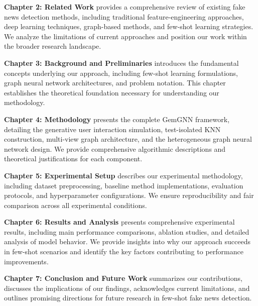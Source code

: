 \textbf{Chapter 2: Related Work} provides a comprehensive review of existing fake news detection methods, including traditional feature-engineering approaches, deep learning techniques, graph-based methods, and few-shot learning strategies. We analyze the limitations of current approaches and position our work within the broader research landscape.

\textbf{Chapter 3: Background and Preliminaries} introduces the fundamental concepts underlying our approach, including few-shot learning formulations, graph neural network architectures, and problem notation. This chapter establishes the theoretical foundation necessary for understanding our methodology.

\textbf{Chapter 4: Methodology} presents the complete GemGNN framework, detailing the generative user interaction simulation, test-isolated KNN construction, multi-view graph architecture, and the heterogeneous graph neural network design. We provide comprehensive algorithmic descriptions and theoretical justifications for each component.

\textbf{Chapter 5: Experimental Setup} describes our experimental methodology, including dataset preprocessing, baseline method implementations, evaluation protocols, and hyperparameter configurations. We ensure reproducibility and fair comparison across all experimental conditions.

\textbf{Chapter 6: Results and Analysis} presents comprehensive experimental results, including main performance comparisons, ablation studies, and detailed analysis of model behavior. We provide insights into why our approach succeeds in few-shot scenarios and identify the key factors contributing to performance improvements.

\textbf{Chapter 7: Conclusion and Future Work} summarizes our contributions, discusses the implications of our findings, acknowledges current limitations, and outlines promising directions for future research in few-shot fake news detection.

\EndChapter
